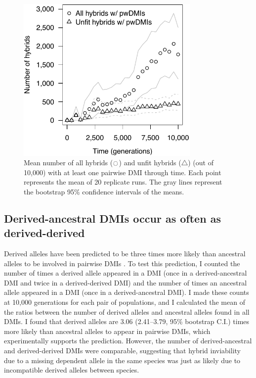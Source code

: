 \begin{doublespace}
\begin{figure}
\begin{center}
\includegraphics[width=3.5in]{all-and-unfit-hybrids.pdf}
\end{center}
\caption{
  Mean number of all hybrids ($\ocircle$)
  and unfit hybrids ($\triangle$) (out of 10,000)
  with at least one pairwise DMI through time.
  Each point represents the mean of 20 replicate runs.
  The gray lines represent the bootstrap 95\%
  confidence intervals of the means.}
\label{all-and-unfit-hybrids}
\end{figure}




\subsection{Derived-ancestral DMIs occur as often as derived-derived}

Derived alleles have been predicted to be three times more likely
than ancestral alleles to be involved in pairwise DMIs \citep{orr95}.
%
To test this prediction, I counted the number of times
a derived allele appeared in a DMI
(once in a derived-ancestral DMI and twice in a derived-derived DMI)
and the number of times an ancestral allele appeared in a DMI
(once in a derived-ancestral DMI).
%
I made these counts at 10,000 generations for each pair of populations,
and I calculated the mean of the ratios between the number of derived alleles
and ancestral alleles found in all DMIs.
%
I found that derived alleles are 3.06 (2.41--3.79, 95\% bootstrap C.I.)
times more likely than ancestral alleles to appear in pairwise DMIs,
which experimentally supports the prediction.
%
However, the number of derived-ancestral and derived-derived DMIs
were comparable, suggesting that hybrid inviability due to
a missing dependent allele in the same species was just as likely due to
incompatible derived alleles between species.




\end{doublespace}
